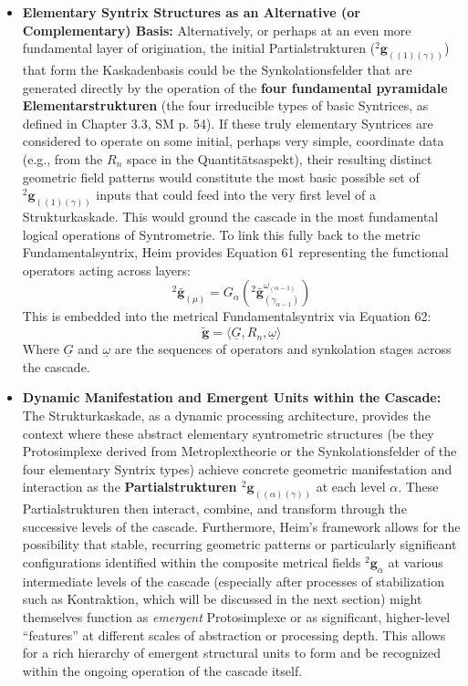\documentclass[12pt]{article}
\newcommand{\q}[1]{\enquote{#1}}
\newcommand{\semantischermetrophor}{R_n}
\newcommand{\kompositionsfeld}{{}^2\mathbf{g}}
\newcommand{\partialstruktur}[1]{{}^2\mathbf{g}_{(#1)}} %
\newcommand{\kaskadenstufe}{\alpha}
\begin{document}
\begin{itemize}
    \item \textbf{Elementary Syntrix Structures as an Alternative (or Complementary) Basis:}
    Alternatively, or perhaps at an even more fundamental layer of origination, the initial Partialstrukturen (\(\partialstruktur{(1)(\gamma)}\)) that form the Kaskadenbasis could be the Synkolationsfelder that are generated directly by the operation of the \textbf{four fundamental pyramidale Elementarstrukturen} (the four irreducible types of basic Syntrices, as defined in Chapter 3.3, SM p. 54). If these truly elementary Syntrices are considered to operate on some initial, perhaps very simple, coordinate data (e.g., from the \( \semantischermetrophor \) space in the Quantitätsaspekt), their resulting distinct geometric field patterns would constitute the most basic possible set of \( \partialstruktur{(1)(\gamma)} \) inputs that could feed into the very first level of a Strukturkaskade. This would ground the cascade in the most fundamental logical operations of Syntrometrie. To link this fully back to the metric Fundamentalsyntrix, Heim provides Equation 61 representing the functional operators acting across layers:
    \begin{equation}
    {}^2\bar{\mathbf{g}}_{(\mu)} = G_\alpha({}^2\bar{\mathbf{g}}_{(\gamma_{\alpha-1})}^{\omega_{(\alpha-1)}})
    \label{eq:original_operator_G_alpha}
    \end{equation}
    This is embedded into the metrical Fundamentalsyntrix via Equation 62:
    \begin{equation}
    \tilde{\mathbf{g}} = \langle \underline{G}, R_n, \underline{\omega} \rangle
    \label{eq:original_metrical_fundamentalsyntrix}
    \end{equation}
    Where $\underline{G}$ and $\underline{\omega}$ are the sequences of operators and synkolation stages across the cascade.

    \item \textbf{Dynamic Manifestation and Emergent Units within the Cascade:}
    The Strukturkaskade, as a dynamic processing architecture, provides the context where these abstract elementary syntrometric structures (be they Protosimplexe derived from Metroplextheorie or the Synkolationsfelder of the four elementary Syntrix types) achieve concrete geometric manifestation and interaction as the \textbf{Partialstrukturen \( \partialstruktur{(\alpha)(\gamma)} \)} at each level \( \kaskadenstufe \). These Partialstrukturen then interact, combine, and transform through the successive levels of the cascade. Furthermore, Heim's framework allows for the possibility that stable, recurring geometric patterns or particularly significant configurations identified within the composite metrical fields \( \kompositionsfeld_\alpha \) at various intermediate levels of the cascade (especially after processes of stabilization such as Kontraktion, which will be discussed in the next section) might themselves function as \textit{emergent} Protosimplexe or as significant, higher-level \q{features} at different scales of abstraction or processing depth. This allows for a rich hierarchy of emergent structural units to form and be recognized within the ongoing operation of the cascade itself.


\end{itemize}
\end{document}
